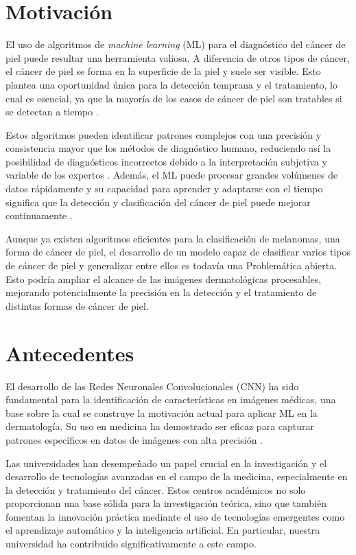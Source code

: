 \section*{Motivación}

El uso de algoritmos de \textit{machine learning} (ML) para el diagnóstico del cáncer de piel puede resultar una herramienta valiosa. A diferencia de otros tipos de cáncer, el cáncer de piel se forma en la superficie de la piel y suele ser visible. Esto plantea una oportunidad única para la detección temprana y el tratamiento, lo cual es esencial, ya que la mayoría de los casos de cáncer de piel son tratables si se detectan a tiempo .

Estos algoritmos pueden identificar patrones complejos con una precisión y consistencia mayor que los métodos de diagnóstico humano, reduciendo así la posibilidad de diagnósticos incorrectos debido a la interpretación subjetiva y variable de los expertos . Además, el ML puede procesar grandes volúmenes de datos rápidamente y su capacidad para aprender y adaptarse con el tiempo significa que la detección y clasificación del cáncer de piel puede mejorar continuamente .

Aunque ya existen algoritmos eficientes para la clasificación de melanomas, una forma de cáncer de piel, el desarrollo de un modelo capaz de clasificar varios tipos de cáncer de piel y generalizar entre ellos es todavía una Problemática abierta. Esto podría ampliar el alcance de las imágenes dermatológicas procesables, mejorando potencialmente la precisión en la detección y el tratamiento de distintas formas de cáncer de piel.


\section*{Antecedentes}

El desarrollo de las Redes Neuronales Convolucionales (CNN) ha sido fundamental para la identificación de características en imágenes médicas, una base sobre la cual se construye la motivación actual para aplicar ML en la dermatología. Su uso en medicina ha demostrado ser eficaz para capturar patrones específicos en datos de imágenes con alta precisión .

Las universidades han desempeñado un papel crucial en la investigación y el desarrollo de tecnologías avanzadas en el campo de la medicina, especialmente en la detección y tratamiento del cáncer. Estos centros académicos no solo proporcionan una base sólida para la investigación teórica, sino que también fomentan la innovación práctica mediante el uso de tecnologías emergentes como el aprendizaje automático y la inteligencia artificial. En particular, nuestra universidad ha contribuido significativamente a este campo.

